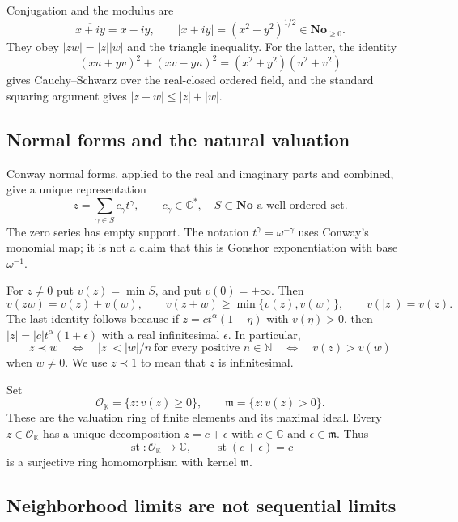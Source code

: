 \documentclass[11pt,letterpaper]{article}
\numberwithin{equation}{section}
\theoremstyle{definition}
\theoremstyle{remark}
\newcommand{\No}{\mathbf{No}}
\newcommand{\K}{\mathbb K}
\newcommand{\C}{\mathbb C}
\newcommand{\N}{\mathbb N}
\newcommand{\OO}{\mathcal O}
\newcommand{\mm}{\mathfrak m}
\DeclareMathOperator{\st}{st}
\begin{document}
Conjugation and the modulus are
\[
 \overline{x+iy}=x-iy,\qquad
 |x+iy|=(x^2+y^2)^{1/2}\in\No_{\ge0}.
\]
They obey $|zw|=|z||w|$ and the triangle inequality. For the latter, the
identity
\[
 (xu+yv)^2+(xv-yu)^2=(x^2+y^2)(u^2+v^2)
\]
gives Cauchy--Schwarz over the real-closed ordered field, and the standard
squaring argument gives $|z+w|\le |z|+|w|$.

\subsection{Normal forms and the natural valuation}

Conway normal forms, applied to the real and imaginary parts and combined,
give a unique representation
\begin{equation}\label{eq:normal}
 z=\sum_{\gamma\in S}c_\gamma t^\gamma,
 \qquad c_\gamma\in\C^*,\quad S\subset\No\text{ a well-ordered set}.
\end{equation}
The zero series has empty support. The notation $t^\gamma=\omega^{-\gamma}$
uses Conway's monomial map; it is not a claim that this is Gonshor
exponentiation with base $\omega^{-1}$.

For $z\ne0$ put $v(z)=\min S$, and put $v(0)=+\infty$.
Then
\begin{equation}\label{eq:valuation}
 v(zw)=v(z)+v(w),\qquad
 v(z+w)\ge\min\{v(z),v(w)\},\qquad v(|z|)=v(z).
\end{equation}
The last identity follows because if $z=c t^\alpha(1+\eta)$ with
$v(\eta)>0$, then $|z|=|c|t^\alpha(1+\epsilon)$ with a real infinitesimal
$\epsilon$. In particular,
\[
 z\prec w\quad\Longleftrightarrow\quad
 |z|<|w|/n\ \text{for every positive }n\in\N
 \quad\Longleftrightarrow\quad v(z)>v(w)
\]
when $w\ne0$. We use $z\prec1$ to mean that $z$ is infinitesimal.

Set
\[
 \OO_\K=\{z:v(z)\ge0\},\qquad
 \mm=\{z:v(z)>0\}.
\]
These are the valuation ring of finite elements and its maximal ideal.
Every $z\in\OO_\K$ has a unique decomposition $z=c+\epsilon$ with
$c\in\C$ and $\epsilon\in\mm$. Thus
\begin{equation}\label{eq:standardpart}
 \st:\OO_\K\longrightarrow\C,\qquad \st(c+\epsilon)=c
\end{equation}
is a surjective ring homomorphism with kernel $\mm$.

\subsection{Neighborhood limits are not sequential limits}
\end{document}

